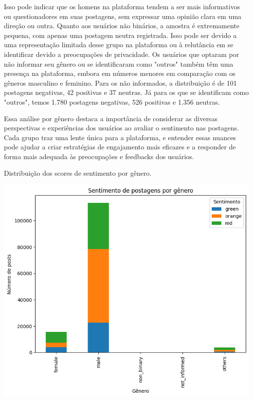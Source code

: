Isso pode indicar que os homens na plataforma tendem a ser mais informativos ou questionadores em suas postagens, sem expressar uma opinião clara em uma direção ou outra. Quanto aos usuários não binários, a amostra é extremamente pequena, com apenas uma postagem neutra registrada. Isso pode ser devido a uma representação limitada desse grupo na plataforma ou à relutância em se identificar devido a preocupações de privacidade. Os usuários que optaram por não informar seu gênero ou se identificaram como "outros" também têm uma presença na plataforma, embora em números menores em comparação com os gêneros masculino e feminino. Para os não informados, a distribuição é de 101 postagens negativas, 42 positivas e 37 neutras. Já para os que se identificam como "outros", temos 1.780 postagens negativas, 526 positivas e 1.356 neutras.

Essa análise por gênero destaca a importância de considerar as diversas perspectivas e experiências dos usuários ao avaliar o sentimento nas postagens. Cada grupo traz uma lente única para a plataforma, e entender essas nuances pode ajudar a criar estratégias de engajamento mais eficazes e a responder de forma mais adequada às preocupações e feedbacks dos usuários.

\begin{quadro}[!htb]
	\caption{Distribuição dos scores de sentimento por gênero.}
	\label{fig:sentiment_by_gender}
	\centering
	\includegraphics[scale=0.8]{images/sentiment_by_gender.png}
	\fautor
\end{quadro}

